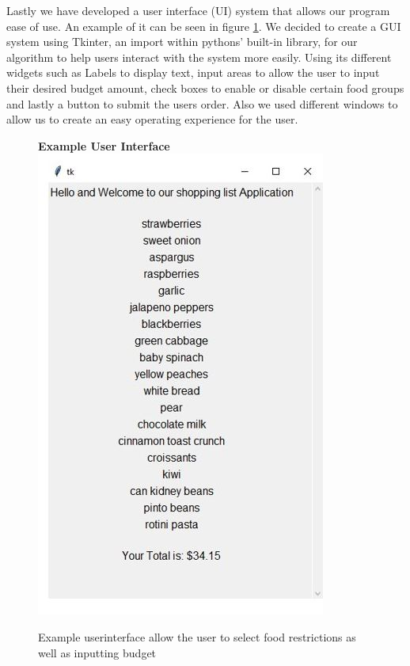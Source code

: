 \documentclass[10pt,journal,compsoc]{IEEEtran}
\begin{document}
Lastly we have developed a user interface (UI) system that allows our program
ease of use. An example of it can be seen in figure \ref{fig:UI3}. We decided to
create a GUI system using Tkinter, an import within pythons' built-in library,
for our algorithm to help users interact with the system more easily. Using its
different widgets such as Labels to display text, input areas to allow the user
to input their desired budget amount, check boxes to enable or disable certain
food groups and lastly a button to submit the users order. Also we used
different windows to allow us to create an easy operating experience for the
user.

\begin{figure}[h]
    \centering
    \textbf{Example User Interface}
    \includegraphics[width=\columnwidth]{assets/finalVersionUI3.JPG}
    \caption{Example userinterface allow the user to select food restrictions as well as inputting budget}
    \label{fig:UI3}
\end{figure}
\end{document}
